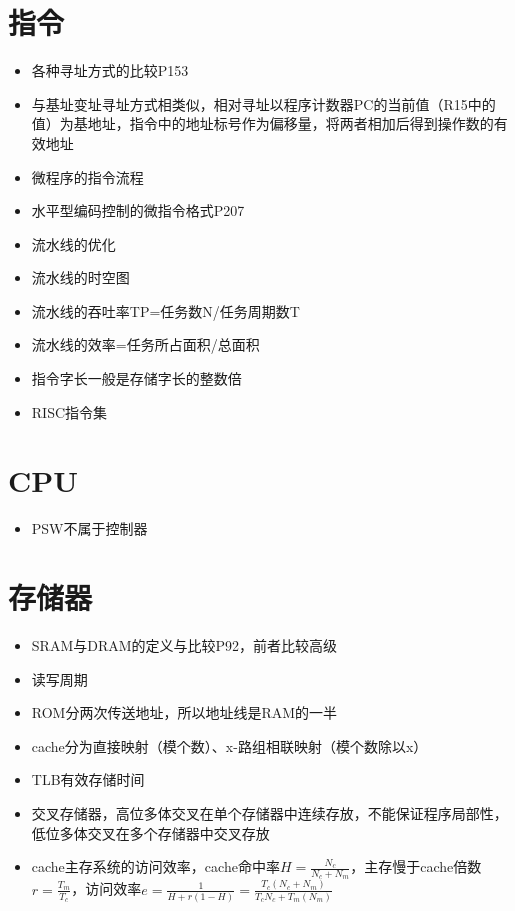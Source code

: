 \documentclass[UTF8]{ctexart}
\begin{document}
\section{指令}
\begin{itemize}
	\item 各种寻址方式的比较P153
	\item 与基址变址寻址方式相类似，相对寻址以程序计数器PC的当前值（R15中的值）为基地址，指令中的地址标号作为偏移量，将两者相加后得到操作数的有效地址
	\item 微程序的指令流程
	\item 水平型编码控制的微指令格式P207
	\item 流水线的优化
	\item 流水线的时空图
	\item 流水线的吞吐率TP=任务数N/任务周期数T
	\item 流水线的效率=任务所占面积/总面积
	\item 指令字长一般是存储字长的整数倍
	\item RISC指令集


\end{itemize}

\section{CPU}
\begin{itemize}
	\item PSW不属于控制器
\end{itemize}

\section{存储器}
\begin{itemize}
	\item SRAM与DRAM的定义与比较P92，前者比较高级
	\item 读写周期

	\item ROM分两次传送地址，所以地址线是RAM的一半

	\item cache分为直接映射（模个数）、x-路组相联映射（模个数除以x）
	\item TLB有效存储时间
	\item 交叉存储器，高位多体交叉在单个存储器中连续存放，不能保证程序局部性，低位多体交叉在多个存储器中交叉存放
	\item cache主存系统的访问效率，cache命中率$H = \frac{N_c}{N_c+N_m}$，主存慢于cache倍数$r=\frac{T_m}{T_c}$，访问效率$e=\frac{1}{H+r(1-H)}=\frac{T_c(N_c+N_m)}{T_cN_c+T_m(N_m)}$

\end{itemize}
\end{document}
